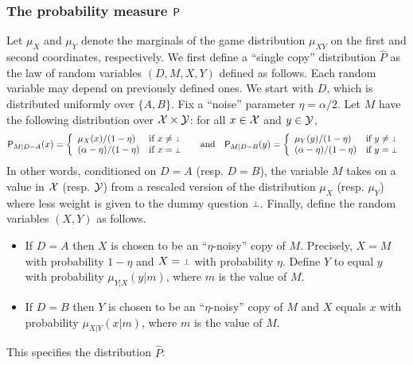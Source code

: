 

\subsubsection{The probability measure $\P$} 
Let $\mu_X$ and $\mu_Y$ denote the marginals of the game distribution $\mu_{XY}$ on the first and second coordinates, respectively. 
We first define a ``single copy'' distribution $\hat{P}$ as the law of random variables $(D,M,X,Y)$ defined as follows. Each random variable may depend on previously defined ones. We start with $D$, which is distributed uniformly over $\{A,B\}$. Fix a ``noise'' parameter $\eta = \alpha/2$. Let $M$ have the following distribution over $\X\times \Y$: for all $x \in \X$ and $y \in \Y$,
\[
	\P_{M | D = A}(x) = \left\{
	\begin{array}{ll}
		\mu_X(x)/(1 - \eta)  & \mbox{if $x \neq \dummy$} \\
		(\alpha - \eta)/(1 - \eta) & \mbox{if $x = \dummy$ }
	\end{array}
\right. \quad \text{and} \quad
	\P_{M | D = B}(y) = \left\{
	\begin{array}{ll}
		\mu_Y(y)/(1 - \eta)  & \mbox{if $y \neq \dummy$} \\
		(\alpha - \eta)/(1 - \eta) & \mbox{if $y = \dummy$ }
	\end{array}
\right.
\]
In other words, conditioned on $D=A$ (resp. $D = B$), the variable $M$ takes on a value in $\X$ (resp. $\Y$) from a rescaled version of the distribution $\mu_X$ (resp. $\mu_Y$) where less weight is given to the dummy question $\dummy$. Finally, define the random variables $(X,Y)$ as follows. 
\begin{itemize}
	\item If $D = A$ then $X$ is chosen to be an ``$\eta$-noisy'' copy of $M$. Precisely, $X = M$ with probability $1 - \eta$ and $X = \dummy$ with probability $\eta$. Define $Y$ to equal $y$ with probability $\mu_{Y|X}(y | m)$, where $m$ is the value of $M$. 
	\item If $D = B$ then $Y$ is chosen to be an ``$\eta$-noisy'' copy of $M$ and $X$ equals $x$ with probability $\mu_{X|Y}(x | m)$, where $m$ is the value of $M$. 
\end{itemize}
This specifies the distribution $\hat{P}$. 


